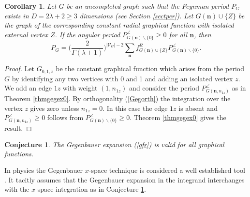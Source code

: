 \documentclass[oneside]{amsart}
\newcommand{\sV}{\mathcal{V}}
\theoremstyle{plain}
\newtheorem{con}[thm]{Conjecture}
\newtheorem{cor}[thm]{Corollary}
\begin{document}
\begin{cor}
Let $G$ be an uncompleted graph such that the Feynman period $P_G$ exists in $D=2\lambda+2\geq3$ dimensions (see Section \ref{sectper}).
Let $G(\mathbf n)\cup\{Z\}$ be the graph of the corresponding constant radial graphical function with isolated external vertex $Z$.
If the angular period $P_{G(\mathbf n)\backslash\{0\}}^\angle\geq0$ for all $\mathbf n$, then
\begin{equation}\label{gfrper}
P_G=\Big(\frac{2}{\Gamma(\lambda+1)}\Big)^{|\sV_G|-2}\sum_{\mathbf n}f_{G(\mathbf n)\cup\{Z\}}^RP_{G(\mathbf n)\backslash\{0\}}^\angle.
\end{equation}
\end{cor}

\begin{proof}
Let $G_{0,1,z}$ be the constant graphical function which arises from the period $G$ by identifying any two vertices with 0 and 1 and adding an isolated vertex $z$.
We add an edge $1z$ with weight $(1,n_{1z})$ and consider the period $P_{G(\mathbf n,n_{1z})}^\angle$ as in Theorem \ref{thmgegex0}. By orthogonality (\ref{Gegorth}) the integration over
the vertex $z$ gives zero unless $n_{1z}=0$. In this case the edge $1z$ is absent and $P_{G(\mathbf n,n_{1z})}^\angle\geq0$ follows from $P_{G(\mathbf n)\backslash\{0\}}^\angle\geq0$.
Theorem \ref{thmgegex0} gives the result.
\end{proof}

\begin{con}\label{congegex}
The Gegenbauer expansion (\ref{gfr}) is valid for all graphical functions.
\end{con}
In physics the Gegenbauer $x$-space technique is considered a well established tool \cite{geg}. It tacitly assumes that the Gegenbauer expansion in the integrand interchanges with the
$x$-space integration as in Conjecture \ref{congegex}.
\end{document}
